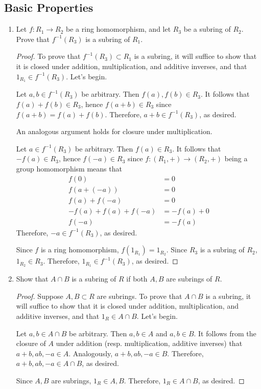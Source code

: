 \documentclass[../psets.tex]{subfiles}
\begin{document}
\subsection*{Basic Properties}
\begin{enumerate}[start=7]
    \item Let $f:R_1\to R_2$ be a ring homomorphism, and let $R_3$ be a subring of $R_2$. Prove that $f^{-1}(R_3)$ is a subring of $R_1$.
    \begin{proof}
        To prove that $f^{-1}(R_3)\subset R_1$ is a subring, it will suffice to show that it is closed under addition, multiplication, and additive inverses, and that $1_{R_1}\in f^{-1}(R_3)$. Let's begin.\par\smallskip
        Let $a,b\in f^{-1}(R_3)$ be arbitrary. Then $f(a),f(b)\in R_3$. It follows that $f(a)+f(b)\in R_3$, hence $f(a+b)\in R_3$ since $f(a+b)=f(a)+f(b)$. Therefore, $a+b\in f^{-1}(R_3)$, as desired.\par
        An analogous argument holds for closure under multiplication.\par
        Let $a\in f^{-1}(R_3)$ be arbitrary. Then $f(a)\in R_3$. It follows that $-f(a)\in R_3$, hence $f(-a)\in R_3$ since $f:(R_1,+)\to(R_2,+)$ being a group homomorphism means that
        \begin{align*}
            f(0) &= 0\\
            f(a+(-a)) &= 0\\
            f(a)+f(-a) &= 0\\
            -f(a)+f(a)+f(-a) &= -f(a)+0\\
            f(-a) &= -f(a)
        \end{align*}
        Therefore, $-a\in f^{-1}(R_3)$, as desired.\par
        Since $f$ is a ring homomorphism, $f(1_{R_1})=1_{R_2}$. Since $R_3$ is a subring of $R_2$, $1_{R_2}\in R_3$. Therefore, $1_{R_1}\in f^{-1}(R_3)$, as desired.
    \end{proof}
    \item Show that $A\cap B$ is a subring of $R$ if both $A,B$ are subrings of $R$.
    \begin{proof}
        Suppose $A,B\subset R$ are subrings. To prove that $A\cap B$ is a subring, it will suffice to show that it is closed under addition, multiplication, and additive inverses, and that $1_R\in A\cap B$. Let's begin.\par\smallskip
        Let $a,b\in A\cap B$ be arbitrary. Then $a,b\in A$ and $a,b\in B$. It follows from the closure of $A$ under addition (resp. multiplication, additive inverses) that $a+b,ab,-a\in A$. Analogously, $a+b,ab,-a\in B$. Therefore, $a+b,ab,-a\in A\cap B$, as desired.\par
        Since $A,B$ are subrings, $1_R\in A,B$. Therefore, $1_R\in A\cap B$, as desired.
    \end{proof}
\end{enumerate}
\end{document}
